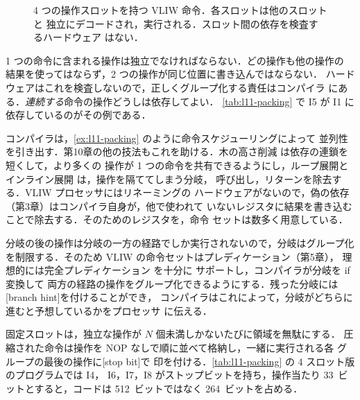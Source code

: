 \documentclass[../main.tex]{subfiles}
\begin{document}
\begin{figure}[htbp]
  \centering
  
  \caption{4 つの操作スロットを持つ VLIW 命令．各スロットは他のスロットと
    独立にデコードされ，実行される．スロット間の依存を検査するハードウェア
    はない．}
  \label{fig:l11-format}
\end{figure}

1 つの命令に含まれる操作は独立でなければならない．どの操作も他の操作の
結果を使ってはならず，2 つの操作が同じ位置に書き込んではならない．
ハードウェアはこれを検査しないので，正しくグループ化する責任はコンパイラ
にある．\emph{連続する}命令の操作どうしは依存してよい．
\cref{tab:l11-packing} で I5 が I1 に依存しているのがその例である．

コンパイラは，\cref{ex:l11-packing} のように命令スケジューリングによって
並列性を引き出す．第10章の他の技法もこれを助ける．木の高さ削減
は依存の連鎖を短くして，より多くの
操作が 1 つの命令を共有できるようにし，ループ展開とインライン展開
は，操作を隔ててしまう分岐，
呼び出し，リターンを除去する．VLIW プロセッサにはリネーミングの
ハードウェアがないので，偽の依存（第3章）はコンパイラ自身が，他で使われて
いないレジスタに結果を書き込むことで除去する．そのためのレジスタを，命令
セットは数多く用意している．

分岐の後の操作は分岐の一方の経路でしか実行されないので，分岐はグループ化
を制限する．そのため VLIW の命令セットはプレディケーション（第5章），
理想的には完全プレディケーション
を十分に
サポートし，コンパイラが分岐を if 変換して
両方の経路の操作をグループ化できるようにする．残った分岐には
[branch hint]を付けることができ，
コンパイラはこれによって，分岐がどちらに進むと予想しているかをプロセッサ
に伝える．

固定スロットは，独立な操作が $N$ 個未満しかないたびに領域を無駄にする．
圧縮された命令は操作を NOP なしで順に並べて格納し，一緒に実行される各
グループの最後の操作に[stop bit]で
印を付ける．\cref{tab:l11-packing} の 4 スロット版のプログラムでは I4，
I6，I7，I8 がストップビットを持ち，操作当たり 33~ビットとすると，コードは
512~ビットではなく 264~ビットを占める．
\end{document}

